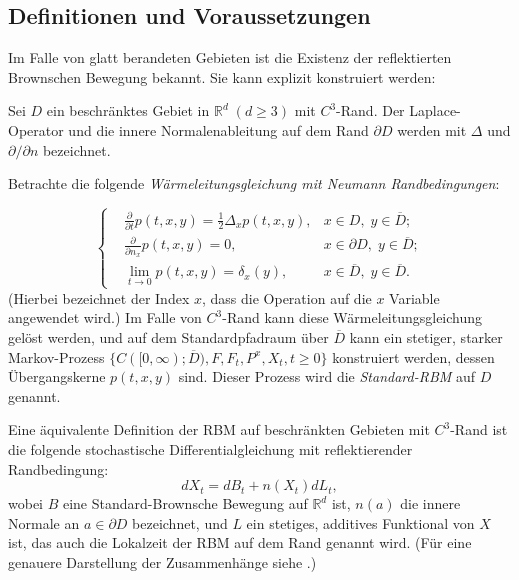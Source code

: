 \documentclass[10pt, a4paper, leqno, twoside, bibliography=totocnumbered, final]{scrartcl}
\theoremstyle{definition}
\theoremstyle{plain}%
\theoremstyle{remark}
\begin{document}
\subsection{Definitionen und Voraussetzungen}

Im Falle von glatt berandeten Gebieten ist die Existenz der reflektierten Brownschen Bewegung bekannt. Sie kann explizit konstruiert werden:

Sei $ D $ ein beschränktes Gebiet in $ \mathbb{R}^d \; (d \geq 3) $ mit $ C^3 $-Rand. Der Laplace-Operator und die innere Normalenableitung auf dem Rand $ \partial D $ werden mit $ \Delta $ und $ \partial / \partial n $ bezeichnet.

Betrachte die folgende \emph{Wärmeleitungsgleichung mit Neumann Randbedingungen}:

\begin{equation}
\label{eq:PDE}
\left \{ \begin{aligned}
& \frac{\partial}{\partial t} p(t,x,y)  = \frac{1}{2} \Delta_x p(t,x,y),  & x \in D, \;  y \in \overline{D}; \\
& \frac{\partial}{\partial n_x} p(t,x,y)  = 0,  & x \in \partial D, \;  y \in \overline{D}; \\
& \lim_{t \to 0} p(t,x,y)  = \delta_x (y),  & x \in \overline{D}, \;  y \in \overline{D}.
\end{aligned}\right .
\end{equation}
(Hierbei bezeichnet der Index $ x $, dass die Operation auf die $ x $ Variable angewendet wird.) Im Falle von $ C^3 $-Rand kann diese Wärmeleitungsgleichung gelöst werden, und auf dem Standardpfadraum über $ \overline{D} $ kann ein stetiger, starker Markov-Prozess $ \{ C([0, \infty); \overline{D}), F, F_t, P^x, X_t , t \geq 0 \} $  konstruiert werden, dessen Übergangskerne $ p(t,x,y) $ sind. Dieser Prozess wird die \emph{Standard-RBM} auf $ D $ genannt. 

Eine äquivalente Definition der RBM auf beschränkten Gebieten mit $ C^3 $-Rand ist die folgende stochastische Differentialgleichung mit reflektierender Randbedingung:
\begin{equation*}
dX_t = dB_t + n(X_t) dL_t,
\end{equation*}
wobei $ B $ eine Standard-Brownsche Bewegung auf $ \mathbb{R}^d $ ist, $ n(a) $ die innere Normale an $ a \in \partial D $ bezeichnet, und $ L $ ein stetiges, additives Funktional von $ X $ ist, das auch die Lokalzeit der RBM auf dem Rand genannt wird. (Für eine genauere Darstellung der Zusammenhänge siehe \cite{Hsu}.)
\end{document}
